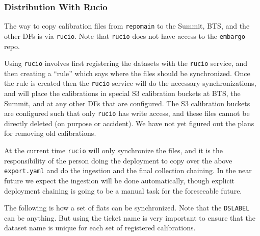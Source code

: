 \documentclass[DM,authoryear,toc]{lsstdoc}
\begin{document}
\subsubsection{Distribution With Rucio}

The way to copy calibration files from \texttt{\/repo\/main} to the Summit, BTS, and the other DFs is via \texttt{rucio}.
Note that \texttt{rucio} does not have access to the \texttt{embargo} repo.

Using \texttt{rucio} involves first registering the datasets with the \texttt{rucio} service, and then creating a ``rule'' which says where the files should be synchronized.
Once the rule is created then the \texttt{rucio} service will do the necessary synchronizations, and will place the calibrations in special S3 calibration buckets at BTS, the Summit, and at any other DFs that are configured.
The S3 calibration buckets are configured such that only \texttt{rucio} has write access, and these files cannot be directly deleted (on purpose or accident).
We have not yet figured out the plans for removing old calibrations.

At the current time \texttt{rucio} will only synchronize the files, and it is the responsibility of the person doing the deployment to copy over the above \texttt{export.yaml} and do the ingestion and the final collection chaining.
In the near future we expect the ingestion will be done automatically, though explicit deployment chaining is going to be a manual task for the foreseeable future.

The following is how a set of flats can be synchronized.
Note that the \texttt{DSLABEL} can be anything.
But using the ticket name is very important to ensure that the dataset name is unique for each set of registered calibrations.
\end{document}
